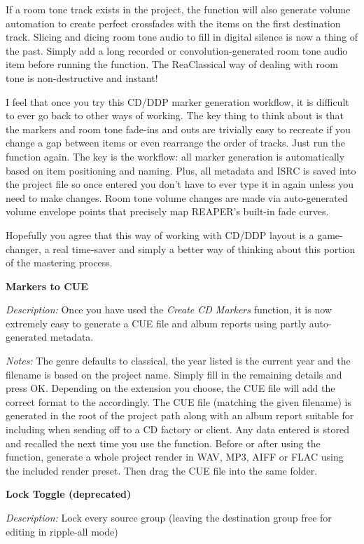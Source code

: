 \documentclass[10pt,american]{article}
\begin{document}
If a room tone track exists in the project, the function will also generate
volume automation to create perfect crossfades with the items on the first
destination track. Slicing and dicing room tone audio to fill in digital silence
is now a thing of the past. Simply add a long recorded or convolution-generated
room tone audio item before running the function. The ReaClassical way of
dealing with room tone is non-destructive and instant! 

I feel that once you try this CD/DDP marker generation workflow, it is difficult
to ever go back to other ways of working. The key thing to think about is that
the markers and room tone fade-ins and outs are trivially easy to recreate if
you change a gap between items or even rearrange the order of tracks. Just run
the function again. The key is the workflow: all marker generation is
automatically based on item positioning and naming. Plus, all metadata and ISRC
is saved into the project file so once entered you don't have to ever type it in
again unless you need to make changes. Room tone volume changes are made via
auto-generated volume envelope points that precisely map REAPER's built-in fade
curves.

Hopefully you agree that this way of working with CD/DDP layout is a
game-changer, a real time-saver and simply a better way of thinking about this
portion of the mastering process.

\textbf{Markers to CUE }

\emph{Description: }Once you have used the \emph{Create CD Markers }function, it
is now extremely easy to generate a CUE file and album reports using partly
auto-generated metadata.

\emph{Notes: }The genre defaults to classical, the year listed is the current
year and the filename is based on the project name. Simply fill in the remaining
details and press OK. Depending on the extension you choose, the CUE file will
add the correct format to the accordingly. The CUE file (matching the given
filename) is generated in the root of the project path along with an album
report suitable for including when sending off to a CD factory or client. Any
data entered is stored and recalled the next time you use the function. Before
or after using the function, generate a whole project render in WAV, MP3, AIFF
or FLAC using the included render preset. Then drag the CUE file into the same
folder.

\textbf{Lock Toggle (deprecated)}

\emph{Description: }Lock every source group (leaving the destination group free
for editing in ripple-all mode)
\end{document}
